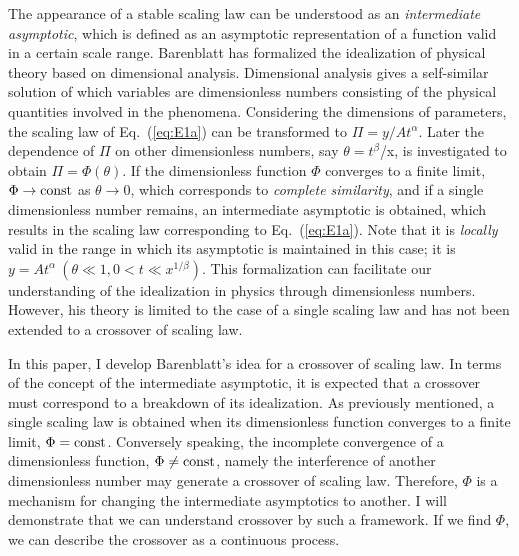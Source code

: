 \documentclass[default,iicol,10pt]{sn-jnl}%
\theoremstyle{thmstyleone}%
\theoremstyle{thmstyletwo}%
\theoremstyle{thmstylethree}%
\begin{document}
The appearance of a stable scaling law can be understood as an {\it intermediate asymptotic}\cite{InterAsym, BarenInter,Barenblatt1996,Barenblatt2014,Barenblatt1972,Goldenfeld,Goldenfeld1992,Oono2013,Benzaquen2013,Baumchen2013,Maruoka2019}, which is defined as an asymptotic representation of a function valid in a certain scale range. Barenblatt has formalized the idealization of physical theory based on dimensional analysis. Dimensional analysis gives a self-similar solution of which variables are dimensionless numbers consisting of the physical quantities involved in the phenomena. Considering the dimensions of parameters, the scaling law of Eq.~(\ref{eq:E1a}) can be transformed to $\Pi = y/At^{\alpha}$. Later the dependence of $\Pi$ on other dimensionless numbers, say $\theta = t^{\beta}$/x, is investigated to obtain $\Pi = \Phi (\theta)$. If the dimensionless function $\Phi$ converges to a finite limit, $\Phi \rightarrow {\rm const}$ as $\theta \rightarrow 0$, which corresponds to {\it complete similarity}\cite{CompSim}, and if a single dimensionless number remains, an intermediate asymptotic is obtained, which results in the scaling law corresponding to Eq.~(\ref{eq:E1a}). Note that it is {\it locally} valid in the range in which its asymptotic is maintained in this case; it is $y = At^{\alpha}~( \theta \ll 1,  0 < t \ll x^{1/\beta})$\cite{InterAsym}. This formalization can facilitate our understanding of the idealization in physics through dimensionless numbers. However, his theory is limited to the case of a single scaling law and has not been extended to a crossover of scaling law. 

In this paper, I develop Barenblatt's idea for a crossover of scaling law. In terms of the concept of the intermediate asymptotic, it is expected that a crossover must correspond to a breakdown of its idealization. As previously mentioned, a single scaling law is obtained when its dimensionless function converges to a finite limit, $\Phi = {\rm const}$. Conversely speaking, the incomplete convergence of a dimensionless function, $\Phi \neq {\rm const}$, namely the interference of another dimensionless number may generate a crossover of scaling law. Therefore, $\Phi$ is a mechanism for changing the intermediate asymptotics to another. I will demonstrate that we can understand crossover by such a framework. If we find $\Phi$, we can describe the crossover as a continuous process.
\end{document}
